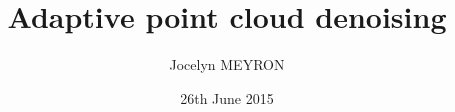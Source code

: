 \documentclass[12pt, a4paper]{memoir} %
\title{Adaptive point cloud denoising}%
\author{Jocelyn MEYRON}
\date{26th June 2015} %
\begin{document}
\frontmatter
\begin{titlingpage}
\maketitle
\end{titlingpage}
\setlength{\parskip}{-1pt plus 1pt}


\cleardoublepage

\tableofcontents* %
\normalsize

\mainmatter
\SingleSpace







\backmatter
\appendix







\end{document}
